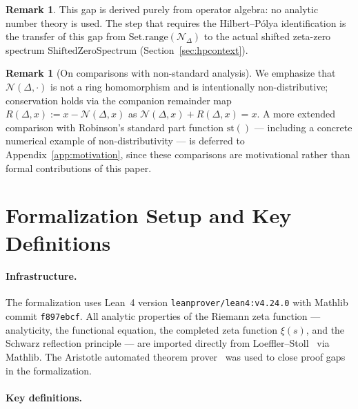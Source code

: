 \documentclass[12pt, a4paper]{article}
\theoremstyle{plain}
\theoremstyle{definition}
\newtheorem{remark}[theorem]{Remark}
\newcommand{\N}{\mathcal{N}}
\newcommand{\Lean}{\textsf{Lean~4}}
\newcommand{\Aristotle}{\textsf{Aristotle}}
\begin{document}
\begin{remark}
This gap is derived purely from operator algebra: no analytic number theory
is used.
The step that requires the Hilbert--P\'{o}lya identification is the transfer
of this gap from $\mathrm{Set.range}(\N_\Delta)$ to the actual
shifted zeta-zero spectrum $\mathrm{ShiftedZeroSpectrum}$
(Section~\ref{sec:hpcontext}).
\end{remark}

\begin{remark}[On comparisons with non-standard analysis]
\label{rem:nsa-pointer}
We emphasize that $\N(\Delta, \cdot)$ is not a ring homomorphism and is
intentionally non-distributive; conservation holds via the companion
remainder map $R(\Delta, x) := x - \N(\Delta, x)$ as
$\N(\Delta, x) + R(\Delta, x) = x$.
A more extended comparison with Robinson's standard part function
$\mathrm{st}()$ --- including a concrete numerical example of
non-distributivity --- is deferred to
Appendix~\ref{app:motivation}, since these comparisons are motivational
rather than formal contributions of this paper.
\end{remark}

\section{Formalization Setup and Key Definitions}
\label{sec:setup}

\paragraph{Infrastructure.}
The formalization uses \Lean{} version \texttt{leanprover/lean4:v4.24.0}
with Mathlib commit \texttt{f897ebcf}.
All analytic properties of the Riemann zeta function --- analyticity,
the functional equation, the completed zeta function $\xi(s)$,
and the Schwarz reflection principle --- are imported directly from
Loeffler--Stoll~\cite{loeffler2025} via Mathlib.
The \Aristotle{} automated theorem prover~\cite{aristotle2025}
was used to close proof gaps in the formalization.

\paragraph{Key definitions.}
\end{document}
